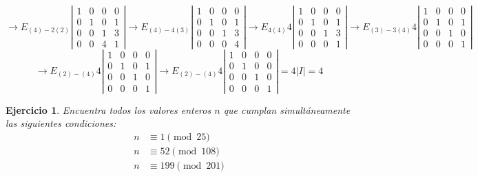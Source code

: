 \documentclass{amsart}
\newtheorem{ejer}{Ejercicio}
\begin{document}
$$
\to E_{(4) - 2(2)}
\left|\begin{array}{rrrr}
	1 & 0 & 0 & 0 \\
	0 & 1 & 0 & 1 \\
	0 & 0 & 1 & 3 \\
	0 & 0 & 4 & 1
\end{array}\right|
\to E_{(4) - 4(3)}
\left|\begin{array}{rrrr}
	1 & 0 & 0 & 0 \\
	0 & 1 & 0 & 1 \\
	0 & 0 & 1 & 3 \\
	0 & 0 & 0 & 4
\end{array}\right|
\to E_{4(4)} 4
\left|\begin{array}{rrrr}
	1 & 0 & 0 & 0 \\
	0 & 1 & 0 & 1 \\
	0 & 0 & 1 & 3 \\
	0 & 0 & 0 & 1
\end{array}\right|
\to E_{(3) - 3(4)} 4
\left|\begin{array}{rrrr}
	1 & 0 & 0 & 0 \\
	0 & 1 & 0 & 1 \\
	0 & 0 & 1 & 0 \\
	0 & 0 & 0 & 1
\end{array}\right|
$$
$$
\to E_{(2) - (4)} 4
\left|\begin{array}{rrrr}
	1 & 0 & 0 & 0 \\
	0 & 1 & 0 & 1 \\
	0 & 0 & 1 & 0 \\
	0 & 0 & 0 & 1
\end{array}\right|
\to E_{(2) - (4)} 4
\left|\begin{array}{rrrr}
	1 & 0 & 0 & 0 \\
	0 & 1 & 0 & 0 \\
	0 & 0 & 1 & 0 \\
	0 & 0 & 0 & 1
\end{array}\right|
= 4 |I| = 4
$$

\pagebreak

\begin{ejer}
Encuentra todos los valores enteros $n$ que cumplan 
simultáneamente las siguientes condiciones:
\begin{align*}
n & \equiv 1 \pmod{25} \\
n & \equiv 52 \pmod{108} \\
n & \equiv 199 \pmod{201} 
\end{align*}
\end{ejer}
\end{document}
